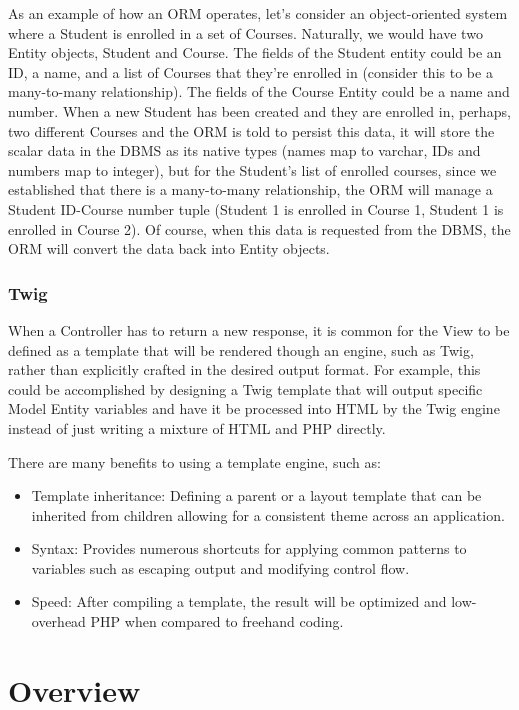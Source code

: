 \documentclass[letterpaper,12pt]{report}
\begin{document}
As an example of how an ORM operates, let's consider an object-oriented system where a Student is enrolled in a set of Courses. Naturally, we would have two Entity objects, Student and Course. The fields of the Student entity could be an ID, a name, and a list of Courses that they're enrolled in (consider this to be a many-to-many relationship). The fields of the Course Entity could be a name and number. When a new Student has been created and they are enrolled in, perhaps, two different Courses and the ORM is told to persist this data, it will store the scalar data in the  DBMS as its native types (names map to varchar, IDs and numbers map to integer), but for the Student's list of enrolled courses, since we established that there is a many-to-many relationship, the ORM will manage a Student ID-Course number tuple (Student 1 is enrolled in Course 1, Student 1 is enrolled in Course 2). Of course, when this data is requested from the DBMS, the ORM will convert the data back into Entity objects.

\subsubsection*{Twig}

When a Controller has to return a new response, it is common for the View to be defined as a template that will be rendered though an engine, such as Twig, rather than explicitly crafted in the desired output format. For example, this could be accomplished by designing a Twig template that will output specific Model Entity variables and have it be processed into HTML by the Twig engine instead of just writing a mixture of HTML and PHP directly.

There are many benefits to using a template engine, such as:

\begin{itemize}
	\item Template inheritance: Defining a parent or a layout template that can be inherited from children allowing for a consistent theme across an application.
	\item Syntax: Provides numerous shortcuts for applying common patterns to variables such as escaping output and modifying control flow.
	\item Speed: After compiling a template, the result will be optimized and low-overhead PHP when compared to freehand coding.
\end{itemize}

\section*{Overview}
\end{document}

